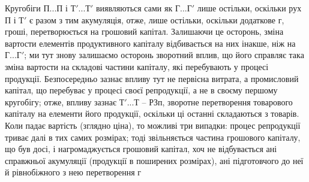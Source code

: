 Кругобіги $П... П$ і $Т'... Т'$ виявляються сами як $Г... Г'$ лише
остільки, оскільки рух П і $Т'$ є разом з тим акумуляція, отже, лише
остільки, оскільки додаткове г, гроші, перетворюється на грошовий капітал.
Залишаючи це осторонь, зміна вартости елементів продуктивного капіталу
відбивається на них інакше, ніж на $Г... Г'$; ми тут знову залишаємо
осторонь зворотний вплив, що його справляє така зміна вартости на складові
частини капіталу, які перебувають у процесі продукції. Безпосередньо
зазнає впливу тут не первісна витрата, а промисловий капітал, що перебуває
у процесі своєї репродукції, а не в своєму першому кругобігу;
отже, впливу зазнає $Т'... Т$ – $Р Зп$, зворотне перетворення товарового
капіталу на елементи його продукції, оскільки ці останні складаються з товарів.
Коли падає вартість (зглядно ціна), то можливі три випадки: процес
репродукції триває далі в тих самих розмірах; тоді звільняється частина
грошового капіталу, що був досі, і нагромаджується грошовий капітал,
хоч не відбувається ані справжньої акумуляції (продукції в поширених
розмірах), ані підготовчого до неї й рівнобіжного з нею перетворення г
\parbreak{}  %
